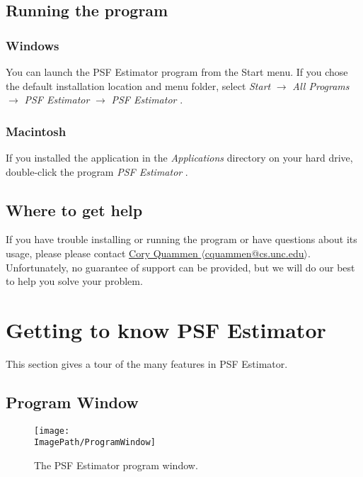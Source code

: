 \documentclass[11pt,titlepage,twoside]{article}
\begin{document}
\subsection{Running the program}

\subsubsection{Windows}

You can launch the PSF Estimator program from the Start menu. If you chose the default installation location and menu folder, select \emph{Start} $\rightarrow$ \emph{All Programs} $\rightarrow$ \emph{PSF Estimator \ProgramVersionNoSpace} $\rightarrow$ \emph{PSF Estimator \ProgramVersionNoSpace}.

\subsubsection{Macintosh}

If you installed the application in the \emph{Applications} directory on your hard drive, double-click the program \emph{PSF Estimator \ProgramVersionNoSpace}.

\subsection{Where to get help}

If you have trouble installing or running the program or have questions about its usage, please please contact  \href{mailto:cquammen@cs.unc.edu}{Cory Quammen $\langle$cquammen@cs.unc.edu$\rangle$}. Unfortunately, no guarantee of support can be provided, but we will do our best to help you solve your problem.

\section{Getting to know PSF Estimator}

This section gives a tour of the many features in PSF Estimator.

\subsection{Program Window}

\begin{figure}[h]
  \centering
  \texttt{[image: \\ImagePath/ProgramWindow]}
  \caption{The PSF Estimator program window.}
  \label{fig:ProgramWindow}
\end{figure}
\end{document}
